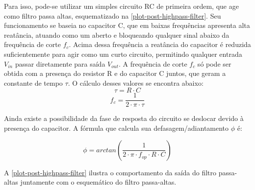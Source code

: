 	Para isso, pode-se utilizar um simples circuito RC de primeira ordem, que age como filtro passa altas, esquematizado na \autoref{plot-post-highpass-filter}. Seu funcionamento se baseia no capacitor C, que em baixas frequências apresenta alta reatância, atuando como um aberto e bloqueando qualquer sinal abaixo da frequência de corte $f_{c}$. Acima dessa frequência a reatância do capacitor é reduzida suficientemente para agir como um curto circuito, permitindo qualquer entrada $V_{in}$ passar diretamente para saída $V_{out}$. A frequência de corte $f_{c}$ só pode ser obtida com a presença do resistor R e do capacitor C juntos, que geram a constante de tempo $\tau$. O cálculo desses valores se encontra abaixo:
	\begin{equation}
	\tau = R \cdot C
	\end{equation}
	\begin{equation}
	f_{c} = \frac{1}{2 \cdot \pi \cdot \tau}
	\end{equation}
	
	Ainda existe a possibilidade da fase de resposta do circuito se deslocar devido à presença do capacitor. A fórmula que calcula sua defasagem/adiantamento $\phi$ é:
	
	\begin{equation}
	\phi = arctan{\left(\frac{1}{2 \cdot \pi \cdot f_{op} \cdot R \cdot C}\right)}
	\end{equation}
	
	A \autoref{plot-post-highpass-filter} ilustra o comportamento da saída do filtro passa-altas juntamente com o esquemático do filtro passa-altas.
	
